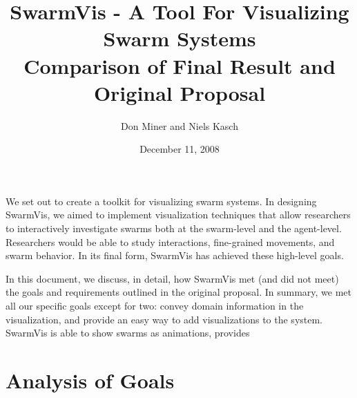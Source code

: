 \documentclass{article}
\title{SwarmVis - A Tool For Visualizing Swarm Systems\\Comparison of Final Result and Original Proposal}
\author{Don Miner and Niels Kasch}
\date{December 11, 2008}
\begin{document}
\maketitle

We set out to create a toolkit for visualizing swarm systems. In designing SwarmVis, we aimed to implement visualization techniques that allow researchers to interactively investigate swarms both at the swarm-level and the agent-level.  Researchers would be able to study interactions, fine-grained movements, and swarm behavior. In its final form, SwarmVis has achieved these high-level goals.

In this document, we discuss, in detail, how SwarmVis met (and did not meet) the goals and requirements outlined in the original proposal.
In summary, we met all our specific goals except for two: convey domain information in the visualization, and provide an easy way to add visualizations to the system. SwarmVis is able to show swarms as animations, provides 

\section{Analysis of Goals}
\end{document}
